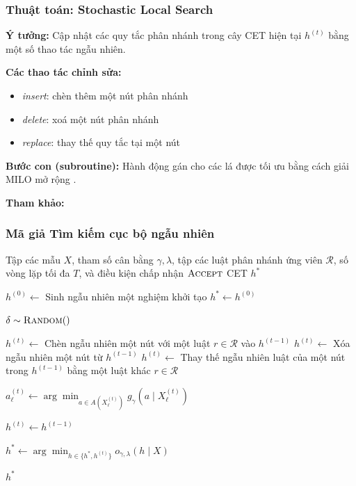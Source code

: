 \documentclass[notheorems, aspectratio=149]{beamer}
\begin{document}
\begin{frame}
    \frametitle{Thuật toán: Stochastic Local Search}

    \textbf{Ý tưởng:}  
    Cập nhật các quy tắc phân nhánh trong cây CET hiện tại $h^{(t)}$  
    bằng một số thao tác ngẫu nhiên.

    \textbf{Các thao tác chỉnh sửa:}
    \begin{itemize}
        \item \textit{insert}: chèn thêm một nút phân nhánh
        \item \textit{delete}: xoá một nút phân nhánh
        \item \textit{replace}: thay thế quy tắc tại một nút
    \end{itemize}

    \textbf{Bước con (subroutine):}  
    Hành động gán cho các lá được tối ưu bằng cách giải MILO mở rộng \parencite{Ustun2019, Kanamori:AISTATS2022}.

    \vspace{0.2cm}
    \textbf{Tham khảo:}  
    \cite{wang2019gainingfreelowcosttransparency, pan2020interpretablecompanionsblackboxmodels}
\end{frame}

\begin{frame}[allowframebreaks]
    \frametitle{Mã giả Tìm kiếm cục bộ ngẫu nhiên}

\begin{algorithmic}[1]
\Require Tập các mẫu $X$, tham số cân bằng $\gamma,\lambda$, tập các luật phân nhánh ứng viên $\mathcal{R}$, số vòng lặp tối đa $T$, và điều kiện chấp nhận $\textsc{Accept}$
\Ensure CET $h^*$

\State $h^{(0)} \gets$ Sinh ngẫu nhiên một nghiệm khởi tạo
\State $h^* \gets h^{(0)}$

    \State $\delta \sim \textsc{Random}()$
    
        \State $h^{(t)} \gets$ Chèn ngẫu nhiên một nút với một luật $r \in \mathcal{R}$ vào $h^{(t-1)}$
        \State $h^{(t)} \gets$ Xóa ngẫu nhiên một nút từ $h^{(t-1)}$
    \Else
        \State $h^{(t)} \gets$ Thay thế ngẫu nhiên luật của một nút trong $h^{(t-1)}$ bằng một luật khác $r \in \mathcal{R}$
    \EndIf
    
        \State $a_\ell^{(t)} \gets \displaystyle \arg\min_{a \in A(X_\ell^{(t)})} g_\gamma\!\left(a \mid X_\ell^{(t)}\right)$
    \EndFor
    
        \State $h^{(t)} \gets h^{(t-1)}$
    \EndIf
    
    \State $h^* \gets \arg\min_{h \in \{h^*,h^{(t)}\}} o_{\gamma,\lambda}(h \mid X)$
\EndFor

\State \Return $h^*$

\end{algorithmic}
\end{frame}
\end{document}
